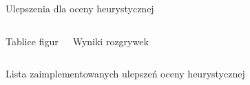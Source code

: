 \begin{frame}{Ulepszenia dla oceny heurystycznej}

    \begin{columns}
            \begin{block}{Tablice figur}
            \end{block}
            \begin{block}{Wyniki rozgrywek}
            \end{block}
    \end{columns}

    \begin{block}{Lista zaimplementowanych ulepszeń oceny heurystycznej}
    \end{block}
\end{frame}